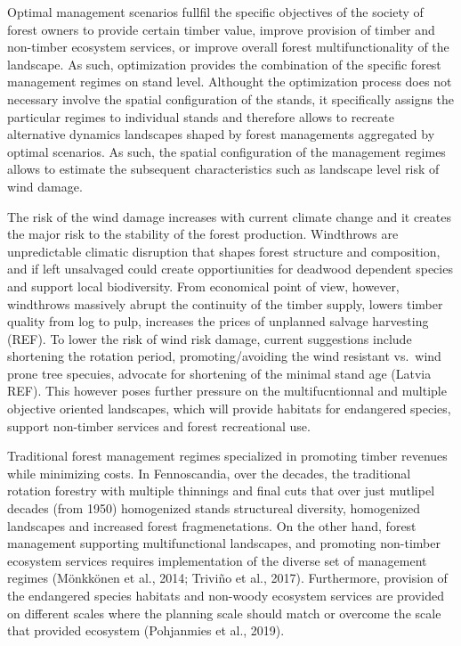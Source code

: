 \documentclass[]{elsarticle} %
\begin{document}
Optimal management scenarios fullfil the specific objectives of the society of forest owners to provide certain timber value, improve provision of timber and non-timber ecosystem services, or improve overall forest multifunctionality of the landscape. As such, optimization provides the combination of the specific forest management regimes on stand level. Althought the optimization process does not necessary involve the spatial configuration of the stands, it specifically assigns the particular regimes to individual stands and therefore allows to recreate alternative dynamics landscapes shaped by forest managements aggregated by optimal scenarios. As such, the spatial configuration of the management regimes allows to estimate the subsequent characteristics such as landscape level risk of wind damage.

The risk of the wind damage increases with current climate change and it creates the major risk to the stability of the forest production. Windthrows are unpredictable climatic disruption that shapes forest structure and composition, and if left unsalvaged could create opportiunities for deadwood dependent species and support local biodiversity. From economical point of view, however, windthrows massively abrupt the continuity of the timber supply, lowers timber quality from log to pulp, increases the prices of unplanned salvage harvesting (REF). To lower the risk of wind risk damage, current suggestions include shortening the rotation period, promoting/avoiding the wind resistant vs.~wind prone tree specuies, advocate for shortening of the minimal stand age (Latvia REF). This however poses further pressure on the multifucntionnal and multiple objective oriented landscapes, which will provide habitats for endangered species, support non-timber services and forest recreational use.

Traditional forest management regimes specialized in promoting timber revenues while minimizing costs. In Fennoscandia, over the decades, the traditional rotation forestry with multiple thinnings and final cuts that over just mutlipel decades (from 1950) homogenized stands structureal diversity, homogenized landscapes and increased forest fragmenetations. On the other hand, forest management supporting multifunctional landscapes, and promoting non-timber ecosystem services requires implementation of the diverse set of management regimes (Mönkkönen et al., 2014; Triviño et al., 2017). Furthermore, provision of the endangered species habitats and non-woody ecosystem services are provided on different scales where the planning scale should match or overcome the scale that provided ecosystem (Pohjanmies et al., 2019).
\end{document}
